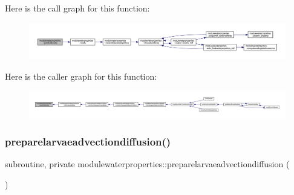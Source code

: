 Here is the call graph for this function\+:\nopagebreak
\begin{figure}[H]
\begin{center}
\leavevmode
\includegraphics[width=350pt]{namespacemodulewaterproperties_a4585c55e4791aa9e486553e2e0ad3c5c_cgraph}
\end{center}
\end{figure}
Here is the caller graph for this function\+:\nopagebreak
\begin{figure}[H]
\begin{center}
\leavevmode
\includegraphics[width=350pt]{namespacemodulewaterproperties_a4585c55e4791aa9e486553e2e0ad3c5c_icgraph}
\end{center}
\end{figure}
\mbox{\label{namespacemodulewaterproperties_ac64c0bef47a698a3d4ee6c542620ff58}} 
\subsubsection{\texorpdfstring{preparelarvaeadvectiondiffusion()}{preparelarvaeadvectiondiffusion()}}
{\footnotesize\ttfamily subroutine, private modulewaterproperties\+::preparelarvaeadvectiondiffusion (\begin{DoxyParamCaption}{ }\end{DoxyParamCaption})\hspace{0.3cm}{\ttfamily [private]}}

